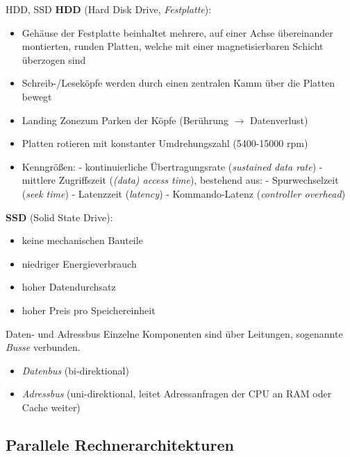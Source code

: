 \begin{bonus}{HDD, SSD}
    \textbf{HDD} (Hard Disk Drive, \emph{Festplatte}):
    \begin{itemize}
        \item Gehäuse der Festplatte beinhaltet mehrere, auf einer Achse übereinander montierten, runden Platten, welche mit einer magnetisierbaren Schicht überzogen sind
        \item Schreib-/Leseköpfe werden durch einen zentralen Kamm über die Platten bewegt
        \item \glqq Landing Zone\grqq zum Parken der Köpfe (Berührung $\to$ Datenverlust)
        \item Platten rotieren mit konstanter Umdrehungszahl (5400-15000 rpm)
        \item Kenngrößen:
              \subitem - kontinuierliche Übertragungsrate (\emph{sustained data rate})
              \subitem - mittlere Zugriffszeit (\emph{(data) access time}), bestehend aus:
              \subsubitem - Spurwechselzeit (\emph{seek time})
              \subsubitem - Latenzzeit (\emph{latency})
              \subsubitem - Kommando-Latenz (\emph{controller overhead})
    \end{itemize}


    \textbf{SSD} (Solid State Drive):
    \begin{itemize}
        \item keine mechanischen Bauteile
        \item niedriger Energieverbrauch
        \item hoher Datendurchsatz
        \item hoher Preis pro Speichereinheit
    \end{itemize}
\end{bonus}

\begin{bonus}{Daten- und Adressbus}
    Einzelne Komponenten sind über Leitungen, sogenannte \emph{Busse} verbunden.
    \begin{itemize}
        \item \emph{Datenbus} (bi-direktional)
        \item \emph{Adressbus} (uni-direktional, leitet Adressanfragen der CPU an RAM oder Cache weiter)
    \end{itemize}
\end{bonus}

\subsection{Parallele Rechnerarchitekturen}

